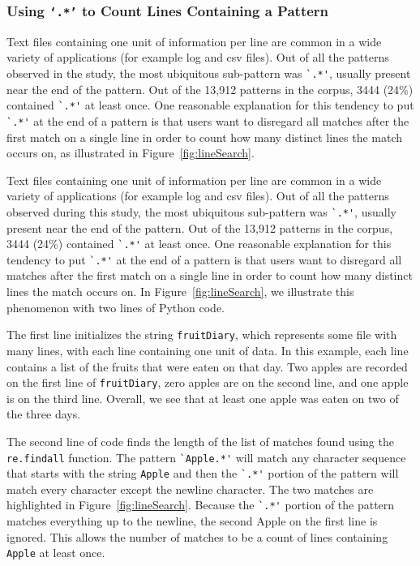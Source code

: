 \subsubsection{Using {\tt`.*'} to Count Lines Containing a Pattern}
Text files containing one unit of information per line are common in a wide variety of applications (for example log and csv files).  Out of all the patterns observed in the study, the most ubiquitous sub-pattern was \verb!`.*'!, usually present near the end of the pattern.  Out of the 13,912 patterns in the corpus, 3444 (24\%) contained \verb!`.*'! at least once.
One reasonable explanation for this tendency to put \verb!`.*'! at the end of a pattern is that users want to disregard all matches after the first match on a single line in order to count how many distinct lines the match occurs on, as illustrated in Figure~\ref{fig:lineSearch}.

Text files containing one unit of information per line are common in a wide variety of applications (for example log and csv files).  Out of all the patterns observed during this study, the most ubiquitous sub-pattern was \verb!`.*'!, usually present near the end of the pattern.  Out of the 13,912 patterns in the corpus, 3444 (24\%) contained \verb!`.*'! at least once.
One reasonable explanation for this tendency to put \verb!`.*'! at the end of a pattern is that users want to disregard all matches after the first match on a single line in order to count how many distinct lines the match occurs on.  In Figure~\ref{fig:lineSearch}, we illustrate this phenomenon with two lines of Python code.

The first line initializes the string {\tt fruitDiary}, which represents some file with many lines, with each line containing one unit of data.  In this example, each line contains a list of the fruits that were eaten on that day.  Two apples are recorded on the first line of {\tt fruitDiary}, zero apples are on the second line, and one apple is on the third line.  Overall, we see that at least one apple was eaten on two of the three days.

The second line of code finds the length of the list of matches found using the {\tt re.findall} function.  The pattern \verb!`Apple.*'! will match any character sequence that starts with the string {\tt Apple} and then the \verb!`.*'! portion of the pattern will match every character except the newline character.  The two matches are highlighted in Figure~\ref{fig:lineSearch}. Because the \verb!`.*'! portion of the pattern matches everything up to the newline, the second Apple on the first line is ignored.  This allows the number of matches to be a count of lines containing {\tt Apple} at least once.

